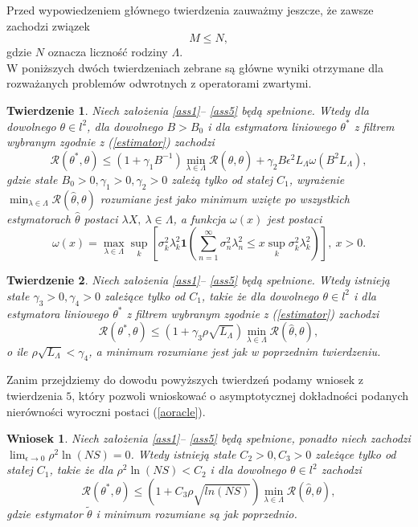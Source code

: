 \documentclass{article}
\newtheorem{tw}{Twierdzenie}
\newtheorem{wn}{Wniosek}
\begin{document}
Przed wypowiedzeniem głównego twierdzenia zauważmy jeszcze, że zawsze zachodzi związek
\begin{displaymath}
M\leq N,
\end{displaymath}
gdzie $N$ oznacza liczność rodziny $\Lambda$.\\
W poniższych dwóch twierdzeniach zebrane są główne wyniki otrzymane dla rozważanych problemów odwrotnych z operatorami zwartymi.
\begin{tw}\label{glowny1}
Niech założenia \ref{ass1}-- \ref{ass5} będą spełnione. Wtedy dla dowolnego $\theta\in l^2$, dla dowolnego $B>B_0$ i dla estymatora liniowego $\theta^*$ z filtrem wybranym zgodnie z (\ref{estimator}) zachodzi
\begin{displaymath}
\mathcal{R}(\theta^*,\theta)\leq (1+\gamma_1B^{-1})\min_{\lambda\in \Lambda}\mathcal{R}(\hat{\theta},\theta)+\gamma_2B\epsilon^2L_{\Lambda}\omega(B^2L_{\Lambda}),
\end{displaymath}
gdzie stałe $B_0>0,\gamma_1>0,\gamma_2>0$ zależą tylko od stałej $C_1$, wyrażenie $\min_{\lambda\in \Lambda}\mathcal{R}(\hat{\theta},\theta)$ rozumiane jest jako minimum wzięte po wszystkich estymatorach $\hat{\theta}$ postaci $\lambda X,\ \lambda\in \Lambda$, a funkcja $\omega(x)$ jest postaci
\begin{displaymath}
\omega(x)=\max_{\lambda\in \Lambda}\sup_k\left[\sigma_k^2\lambda_k^2\pmb{1}\left(\sum_{n=1}^{\infty}\sigma_n^2\lambda_n^2\leq x \sup_k\sigma_k^2\lambda_k^2\right)\right],\ x>0.
\end{displaymath}
\end{tw}
\begin{tw}\label{glowny2}
Niech założenia \ref{ass1}-- \ref{ass5} będą spełnione. Wtedy istnieją stałe $\gamma_3>0,\gamma_4>0$ zależące tylko od $C_1$, takie że dla dowolnego $\theta\in l^2$ i dla estymatora liniowego $\theta^*$ z filtrem wybranym zgodnie z (\ref{estimator}) zachodzi
\begin{displaymath}
\mathcal{R}(\theta^*,\theta)\leq (1+\gamma_3\rho\sqrt{L_{\Lambda}})\min_{\lambda\in \Lambda}\mathcal{R}(\hat{\theta},\theta),
\end{displaymath}
o ile $\rho\sqrt{L_{\Lambda}}<\gamma_4$, a minimum rozumiane jest jak w poprzednim twierdzeniu.
\end{tw}
Zanim przejdziemy do dowodu powyższych twierdzeń podamy wniosek z twierdzenia $5$, który pozwoli wnioskować o asymptotycznej dokładności podanych nierówności wyroczni postaci (\ref{aoracle}).
\begin{wn}
Niech założenia \ref{ass1}-- \ref{ass5} będą spełnione, ponadto niech zachodzi $\lim_{\epsilon\to 0}\rho^2\ln(NS)=0$. Wtedy istnieją stałe $C_2>0,C_3>0$ zależące tylko od stałej $C_1$, takie że dla $\rho^2\ln(NS)<C_2$ i dla dowolnego $\theta\in l^2$ zachodzi
\begin{displaymath}
\mathcal{R}(\theta^*,\theta)\leq \left(1+C_3\rho\sqrt{ln(NS)}\right)\min_{\lambda\in \Lambda}\mathcal{R}(\hat{\theta},\theta),
\end{displaymath}
gdzie estymator $\tilde{\theta}$ i minimum rozumiane są jak poprzednio.
\end{wn}
\end{document}
